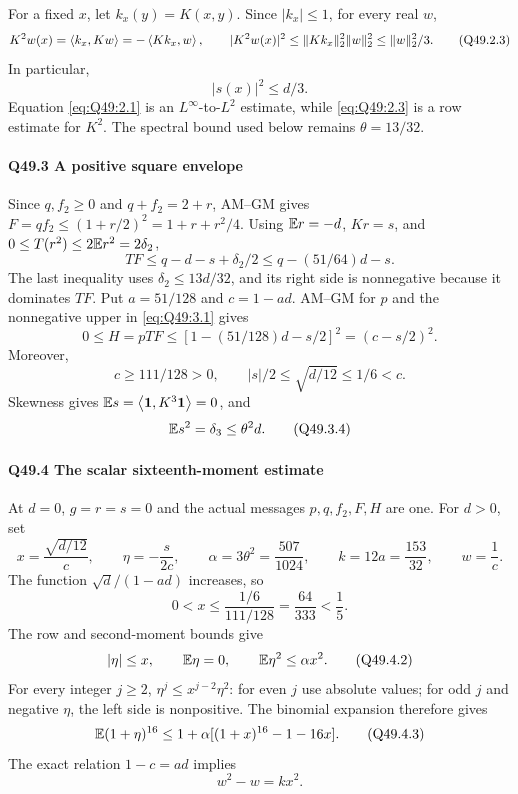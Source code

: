 For a fixed \(x\), let \(k_x(y)=\allowbreak K(x,\allowbreak y)\). Since \(|k_x|\le\allowbreak 1\), for every real \(w\),
\[
K^2w(x)=\left\langle k_x,Kw\right\rangle=-\left\langle Kk_x,w\right\rangle,\qquad
|K^2w(x)|^2\le\|Kk_x\|_2^2\|w\|_2^2\le\|w\|_2^2/3.
\tag{Q49.2.3}\label{eq:Q49:2.3}
\]
In particular,
\[
|s(x)|^2\le d/3.
\tag{Q49.2.4}\label{eq:Q49:2.4}
\]
Equation \eqref{eq:Q49:2.1} is an \(L^\infty\)-to-\(L^2\) estimate, while
\eqref{eq:Q49:2.3} is a row estimate for \(K^2\). The spectral bound used below remains \(\theta=\allowbreak 13/32\).

\paragraph{Q49.3 A positive square envelope}
Since \(q,\allowbreak f_2\ge\allowbreak 0\) and \(q+f_2=\allowbreak 2+r\), AM--GM gives
\(F=\allowbreak qf_2\le\allowbreak (1+r/2)^2=\allowbreak 1+r+r^2/4\).
Using \(\mathbb E r=\allowbreak -d\), \(Kr=\allowbreak s\), and \(0\le\allowbreak  T(r^2)\le\allowbreak 2\mathbb E r^2=\allowbreak 2\delta_2\),
\[
TF\le q-d-s+\delta_2/2\le q-(51/64)d-s.
\tag{Q49.3.1}\label{eq:Q49:3.1}
\]
The last inequality uses \(\delta_2\le\allowbreak 13d/32\), and its right side is nonnegative because it dominates \(TF\).
Put \(a=\allowbreak 51/128\) and \(c=\allowbreak 1-ad\).
AM--GM for \(p\) and the nonnegative upper in \eqref{eq:Q49:3.1} gives
\[
0\le H=pTF\le[1-(51/128)d-s/2]^2=(c-s/2)^2.
\tag{Q49.3.2}\label{eq:Q49:3.2}
\]
Moreover,
\[
c\ge111/128>0,\qquad |s|/2\le\sqrt{d/12}\le1/6<c.
\tag{Q49.3.3}\label{eq:Q49:3.3}
\]
Skewness gives \(\mathbb E s=\allowbreak \left\langle\mathbf1,K^3\mathbf1\right\rangle=\allowbreak 0\), and
\[
\mathbb E s^2=\delta_3\le\theta^2d.
\tag{Q49.3.4}\label{eq:Q49:3.4}
\]

\paragraph{Q49.4 The scalar sixteenth-moment estimate}
At \(d=\allowbreak 0\), \(g=\allowbreak r=\allowbreak s=\allowbreak 0\) and the actual messages \(p,\allowbreak q,\allowbreak f_2,\allowbreak F,\allowbreak H\) are one.
For \(d>\allowbreak 0\), set
\[
x=\frac{\sqrt{d/12}}c,\qquad \eta=-\frac{s}{2c},\qquad
\alpha=3\theta^2=\frac{507}{1024},\qquad
k=12a=\frac{153}{32},\qquad w=\frac1c.
\]
The function \(\sqrt d/(1-ad)\) increases, so
\[
0<x\le\frac{1/6}{111/128}=\frac{64}{333}<\frac15.
\tag{Q49.4.1}\label{eq:Q49:4.1}
\]
The row and second-moment bounds give
\[
|\eta|\le x,\qquad \mathbb E\eta=0,\qquad \mathbb E\eta^2\le\alpha x^2.
\tag{Q49.4.2}\label{eq:Q49:4.2}
\]
For every integer \(j\ge\allowbreak 2\), \(\eta^j\le\allowbreak  x^{j-2}\eta^2\):
for even \(j\) use absolute values; for odd \(j\) and negative \(\eta\), the left side is nonpositive.
The binomial expansion therefore gives
\[
\mathbb E(1+\eta)^{16}
\le1+\alpha[(1+x)^{16}-1-16x].
\tag{Q49.4.3}\label{eq:Q49:4.3}
\]
The exact relation \(1-c=\allowbreak ad\) implies
\[
w^2-w=kx^2.
\tag{Q49.4.4}\label{eq:Q49:4.4}
\]

